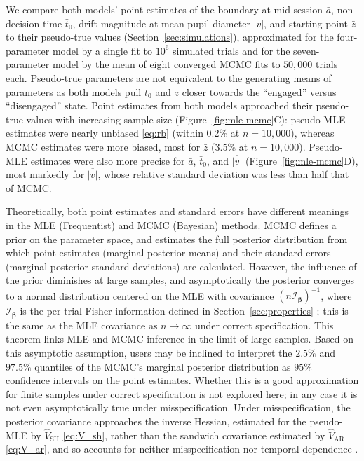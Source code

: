 \documentclass[00-main.tex]{subfiles}
\begin{document}
We compare both models' point estimates of the boundary at mid-session $\bar{a}$, non-decision time $\bar{t}_0$, drift magnitude at mean pupil diameter $\overline{|v|}$, and starting point $\bar{z}$ to their pseudo-true values (Section~\ref{sec:simulations}), approximated for the four-parameter model by a single fit to $10^6$ simulated trials and for the seven-parameter model by the mean of eight converged MCMC fits to $50{,}000$ trials each. Pseudo-true parameters are not equivalent to the generating means of parameters as both models pull $\bar{t}_0$ and $\bar{z}$ closer towards the ``engaged'' versus ``disengaged'' state. Point estimates from both models approached their pseudo-true values with increasing sample size (Figure~\ref{fig:mle-mcmc}C): pseudo-MLE estimates were nearly unbiased \eqref{eq:rb} (within $0.2\%$ at $n=10{,}000$), whereas MCMC estimates were more biased, most for $\bar{z}$ ($3.5\%$ at $n=10{,}000$). Pseudo-MLE estimates were also more precise for $\bar{a}$, $\bar{t}_0$, and $\overline{|v|}$ (Figure~\ref{fig:mle-mcmc}D), most markedly for $\overline{|v|}$, whose relative standard deviation was less than half that of MCMC.

Theoretically, both point estimates and standard errors have different meanings in the MLE (Frequentist) and MCMC (Bayesian) methods. MCMC defines a prior on the parameter space, and estimates the full posterior distribution from which point estimates (marginal posterior means) and their standard errors (marginal posterior standard deviations) are calculated. However, the influence of the prior diminishes at large samples, and asymptotically the posterior converges to a normal distribution centered on the MLE with covariance $(n\mathscr{I}_{\bm\beta})^{-1}$, where $\mathscr{I}_{\bm\beta}$ is the per-trial Fisher information defined in Section~\ref{sec:properties} \citep{van_der_vaart_asymptotic_1998}; this is the same as the MLE covariance as $n \to \infty$ under correct specification.  This theorem links MLE and MCMC inference in the limit of large samples. Based on this asymptotic assumption, users may be inclined to interpret the $2.5\%$ and $97.5\%$ quantiles of the MCMC's marginal posterior distribution as $95\%$ confidence intervals on the point estimates. Whether this is a good approximation for finite samples under correct specification is not explored here; in any case it is not even asymptotically true under misspecification. Under misspecification, the posterior covariance approaches the inverse Hessian, estimated for the pseudo-MLE by $\widehat{V}_\text{SH}$ \eqref{eq:V_sh}, rather than the sandwich covariance estimated by $\widehat{V}_\text{AR}$ \eqref{eq:V_ar}, and so accounts for neither misspecification nor temporal dependence \citep{shaby_open-faced_2014}.
\end{document}
